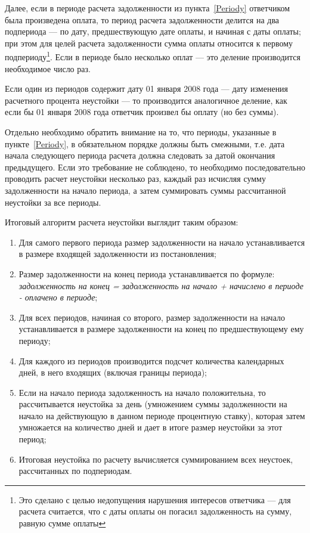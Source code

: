 \documentclass[a4paper,12pt,draft]{article}
\begin{document}
Далее, если в периоде расчета задолженности из пункта~\ref{Periody} ответчиком была произведена оплата, то период расчета задолженности делится на два подпериода --- по дату, предшествующую дате оплаты, и начиная с даты оплаты; при этом для целей расчета задолженности сумма оплаты относится к первому подпериоду\footnote{Это сделано с целью недопущения нарушения интересов ответчика --- для расчета считается, что с даты оплаты он погасил задолженность на сумму, равную сумме оплаты}. Если в периоде было несколько оплат --- это деление производится необходимое число раз.

Если один из периодов содержит дату 01 января 2008 года --- дату изменения расчетного процента неустойки --- то производится аналогичное деление, как если бы 01 января 2008 года ответчик произвел бы оплату (но без суммы).

Отдельно необходимо обратить внимание на то, что периоды, указанные в пункте~\ref{Periody}, в обязательном порядке должны быть смежными, т.е. дата начала следующего периода расчета должна следовать за датой окончания предыдущего. Если это требование не соблюдено, то необходимо последовательно проводить расчет неустойки несколько раз, каждый раз исчисляя сумму задолженности на начало периода, а затем суммировать суммы рассчитанной неустойки за все периоды.

Итоговый алгоритм расчета неустойки выглядит таким образом:
\begin{enumerate}
    \item Для самого первого периода размер задолженности на начало устанавливается в размере входящей задолженности из постановления;
    \item Размер задолженности на конец периода устанавливается по формуле: {\it задолженность на конец = задолженность на начало + начислено в периоде - оплачено в периоде};
    \item Для всех периодов, начиная со второго, размер задолженности на начало устанавливается в размере задолженности на конец по предшествующему ему периоду;
    \item Для каждого из периодов производится подсчет количества календарных дней, в него входящих (включая границы периода);
    \item Если на начало периода задолженность на начало положительна, то рассчитывается неустойка за день (умножением суммы задолженности на начало на действующую в данном периоде процентную ставку), которая затем умножается на количество дней и дает в итоге размер неустойки за этот период;
    \item Итоговая неустойка по расчету вычисляется суммированием всех неустоек, рассчитанных по подпериодам.
\end{enumerate}
\end{document}
